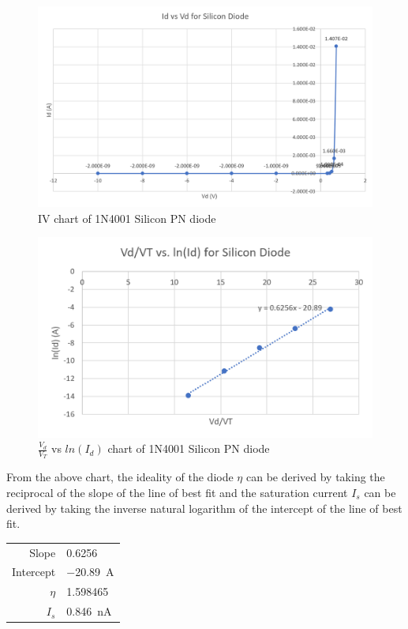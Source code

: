 \documentclass{article}
\begin{document}
\begin{figure}[H]
  \centering
  \includegraphics[width=\textwidth]{ECE2200L_Lab2_Si_IV.png}
  \caption{IV chart of 1N4001 Silicon PN diode}
\end{figure}
\begin{figure}[H]
  \centering
  \includegraphics[width=\textwidth]{ECE2200L_Lab2_Si_log.png}
  \caption{$\frac{V_d}{V_T}$ vs $ln(I_d)$ chart of 1N4001 Silicon PN diode}
\end{figure}

From the above chart, the ideality of the diode $\eta$ can be derived by taking the reciprocal of the slope of the line of best fit and the saturation current $I_s$ can be derived by taking the inverse natural logarithm of the intercept of the line of best fit.

\begin{table}[H]
  \centering
    \begin{tabular}{rl}
    Slope & 0.6256 \\
    Intercept & \SI{-20.89}{\ampere} \\
    $\eta$     & 1.598465 \\
    $I_s$    & \SI{0.846}{\nano\ampere} \\
    \end{tabular}
\end{table}
\end{document}
